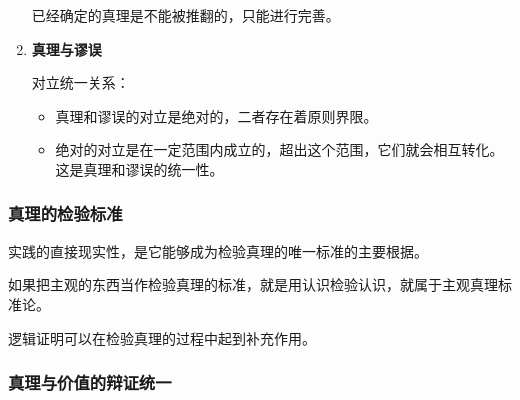 \documentclass[12pt, a4paper, oneside]{ctexart}
\begin{document}
\begin{enumerate}
  已经确定的真理是不能被推翻的，只能进行完善。

  \item {\bf 真理与谬误}
  
  对立统一关系：
  \begin{itemize}
    \item 真理和谬误的对立是绝对的，二者存在着原则界限。
    \item 绝对的对立是在一定范围内成立的，超出这个范围，它们就会相互转化。这是真理和谬误的统一性。
  \end{itemize}
\end{enumerate}

\subsubsection{真理的检验标准}

实践的直接现实性，是它能够成为检验真理的唯一标准的主要根据。

如果把主观的东西当作检验真理的标准，就是用认识检验认识，就属于主观真理标准论。

逻辑证明可以在检验真理的过程中起到补充作用。

\subsubsection{真理与价值的辩证统一}
\end{document}
